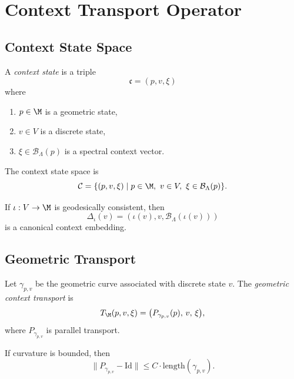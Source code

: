 
\section{Context Transport Operator}

\subsection{Context State Space}

\begin{definition}
A \emph{context state} is a triple
\[
\mathfrak{c} = (p, v, \xi)
\]
where
\begin{enumerate}
    \item $p \in \M$ is a geometric state,
    \item $v \in V$ is a discrete state,
    \item $\xi \in \mathcal{B}_\Lambda(p)$ is a spectral context vector.
\end{enumerate}
The context state space is
\[
\mathcal{C} = \{ (p,v,\xi) \mid p \in \M,\ v \in V,\ \xi \in \mathcal{B}_\Lambda(p) \}.
\]
\end{definition}

\begin{lemma}
If $\iota : V \to \M$ is geodesically consistent, then
\[
\Delta_\iota(v) = (\iota(v), v, \mathcal{B}_\Lambda(\iota(v)))
\]
is a canonical context embedding.
\end{lemma}

\subsection{Geometric Transport}

\begin{definition}
Let $\gamma_{p,v}$ be the geometric curve associated with discrete state $v$.
The \emph{geometric context transport} is
\[
T_\M(p,v,\xi)
= \big( P_{\gamma_{p,v}}(p),\, v,\, \xi \big),
\]
where $P_{\gamma_{p,v}}$ is parallel transport.
\end{definition}

\begin{lemma}
If curvature is bounded, then
\[
\| P_{\gamma_{p,v}} - \mathrm{Id} \|
\le C \cdot \mathrm{length}(\gamma_{p,v}).
\]
\end{lemma}

